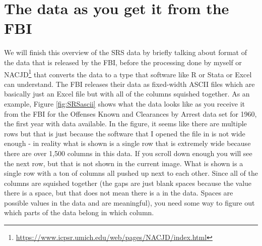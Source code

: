 \documentclass[
]{krantz}
\renewcommand{\href}[2]{#2\footnote{\url{#1}}}
\begin{document}
\section{The data as you get it from the
FBI}\label{the-data-as-you-get-it-from-the-fbi}

We will finish this overview of the SRS data by briefly
talking about format of the data that is released by the
FBI, before the processing done by myself or
\href{https://www.icpsr.umich.edu/web/pages/NACJD/index.html}{NACJD}
that converts the data to a type that software like R or
Stata or Excel can understand. The FBI releases their data
as fixed-width ASCII files which are basically just an Excel
file but with all of the columns squished together. As an
example, Figure \ref{fig:SRSascii} shows what the data looks
like as you receive it from the FBI for the Offenses Known
and Clearances by Arrest data set for 1960, the first year
with data available. In the figure, it seems like there are
multiple rows but that is just because the software that I
opened the file in is not wide enough - in reality what is
shown is a single row that is extremely wide because there
are over 1,500 columns in this data. If you scroll down
enough you will see the next row, but that is not shown in
the current image. What is shown is a single row with a ton
of columns all pushed up next to each other. Since all of
the columns are squished together (the gaps are just blank
spaces because the value there is a space, but that does not
mean there is a in the data. Spaces are possible values in
the data and are meaningful), you need some way to figure
out which parts of the data belong in which column.
\end{document}
